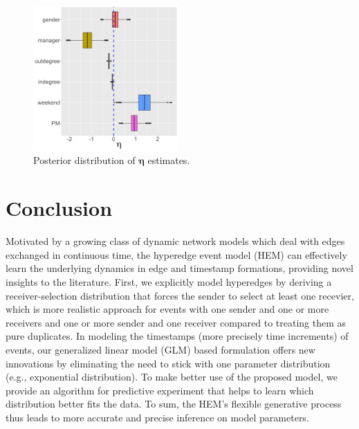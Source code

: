 \documentclass[ba]{imsart}
\numberwithin{equation}{section}
\theoremstyle{plain}
\begin{document}
				\begin{figure}[!t]
					\centering
					\includegraphics[width=0.495\textwidth]{img/etaplotnew-1.png}	
					\caption {Posterior distribution of $\boldsymbol{\eta}$ estimates.}
					\label{figure:etaresults}
				\end{figure}	
\section{Conclusion}\label{sec:conclusion}
Motivated by a growing class of dynamic network models which deal with edges exchanged in continuous time, the hyperedge event model (HEM) can effectively learn the underlying dynamics in edge and timestamp formations, providing novel insights to the literature. First, we explicitly model hyperedges by deriving a receiver-selection distribution that forces the sender to select at least one recevier, which is more realistic approach for events with one sender and one or more receivers and one or more sender and one receiver compared to treating them as pure duplicates. In modeling the timestamps (more precisely time increments) of events, our generalized linear model (GLM) based formulation offers new innovations by eliminating the need to stick with one parameter distribution (e.g., exponential distribution). To make better use of the proposed model, we provide an algorithm for predictive experiment that helps to learn which distribution better fits the data. To sum, the HEM's flexible generative process thus leads to more accurate and precise inference on model parameters.
 
\end{document}
